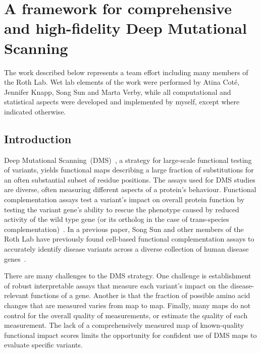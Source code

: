 

\chapter[A comprehensive high-fidelity DMS framework]{A framework for comprehensive and high-fidelity Deep Mutational Scanning}
\label{ch:data1}

The work described below represents a team effort including many members of the Roth Lab. Wet lab elements of the work were performed by Atina Cot\'e, Jennifer Knapp, Song Sun and Marta Verby, while all computational and statistical aspects were developed and implemented by myself, except where indicated otherwise.

\section{Introduction}


Deep Mutational Scanning~(DMS)~\cite{fowler_high-resolution_2010,ernst_coevolution_2010,hietpas_experimental_2011}, a strategy for large-scale functional testing of variants, yields functional maps describing a large fraction of substitutions for an often substantial subset of residue positions. The assays used for DMS studies are diverse, often measuring different aspects of a protein's behaviour. Functional complementation assays test a variant's impact on overall protein function by testing the variant gene's ability to rescue the phenotype caused by reduced activity of the wild type gene (or its ortholog in the case of trans-species complementation)~\cite{lee_complementation_1987,osborn_rescuing_2007}. In a previous paper, Song Sun and other members of the Roth Lab have previously found cell-based functional complementation assays to accurately identify disease variants across a diverse collection of human disease genes~\cite{sun_extended_2016}. 

There are many challenges to the DMS strategy.  One challenge is establishment of robust interpretable assays that measure each variant's impact on the disease-relevant functions of a gene. Another is that the fraction of possible amino acid changes that are measured varies from map to map. Finally, many maps do not control for the overall quality of measurements, or estimate the quality of each measurement. The lack of a comprehensively measured map of known-quality functional impact scores limits the opportunity for confident use of DMS maps to evaluate specific variants.

